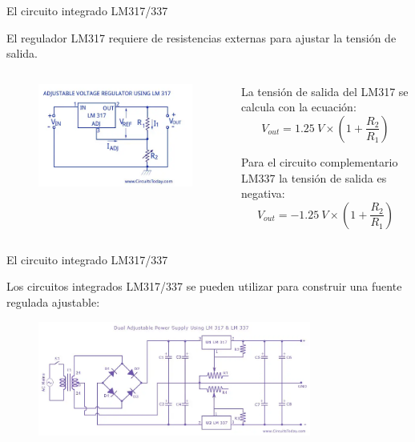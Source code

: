 \documentclass[t,aspectratio=169]{beamer}
\begin{document}
\begin{frame}{El circuito integrado LM317/337}

El regulador LM317 requiere de resistencias externas para ajustar la tensión de salida.

\begin{columns}
\begin{column}{0.6\textwidth}
\begin{figure}
    \centering
    \includegraphics[width=\textwidth]{figures/lm317_working_principle.png}
\end{figure}
\end{column}
\begin{column}{0.4\textwidth}
\vspace{2mm}

La tensión de salida del LM317 se calcula con la ecuación:
%
\[ V_{out} = 1.25\ V \times \left( 1 + \dfrac{R_2}{R_1} \right) \]

Para el circuito complementario LM337 la tensión de salida es negativa:
%
\[ V_{out} = -1.25\ V \times \left( 1 + \dfrac{R_2}{R_1} \right) \]

\end{column}
\end{columns}
\end{frame}


\begin{frame}{El circuito integrado LM317/337}

Los circuitos integrados LM317/337 se pueden utilizar para construir una fuente regulada ajustable:

\begin{figure}
    \centering
    \includegraphics[width=0.8\textwidth]{figures/regulated_power_supply_2.png}
\end{figure}
\end{frame}
\end{document}
